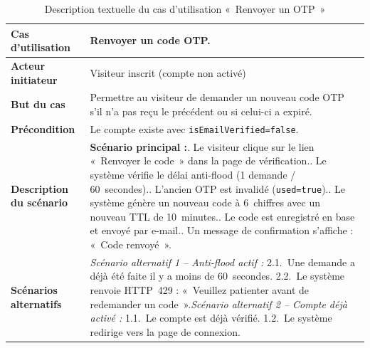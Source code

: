 \begin{table}[H]
  \caption{Description textuelle du cas d'utilisation «~Renvoyer un OTP~»}
  \label{tab:cu-renvoyer-otp}
  \centering
  \begin{tabularx}{\textwidth}{|L{3.8cm}|X|}
    \hline
    \textbf{Cas d'utilisation} & Renvoyer un code OTP. \\
    \hline
    \textbf{Acteur initiateur} & Visiteur inscrit (compte non activé) \\
    \hline
    \textbf{But du cas} & Permettre au visiteur de demander un nouveau code OTP s'il n'a pas reçu le précédent ou si celui-ci a expiré. \\
    \hline
    \textbf{Précondition} & Le compte existe avec \texttt{isEmailVerified=false}. \\
    \hline
    \textbf{Description du scénario} &
    \textbf{Scénario principal :}. Le visiteur clique sur le lien «~Renvoyer le code~» dans la page de vérification.. Le système vérifie le délai anti-flood (1 demande / 60~secondes).. L'ancien OTP est invalidé (\texttt{used=true}).. Le système génère un nouveau code à 6~chiffres avec un nouveau TTL de 10~minutes.. Le code est enregistré en base et envoyé par e-mail.. Un message de confirmation s'affiche : «~Code renvoyé~».\\
    \hline
    \textbf{Scénarios alternatifs} &
    \textit{Scénario alternatif 1 -- Anti-flood actif :}\newline
    \hspace*{6pt}2.1.~Une demande a déjà été faite il y a moins de 60~secondes.\newline
    \hspace*{6pt}2.2.~Le système renvoie HTTP~429 : «~Veuillez patienter avant de redemander un code~».\newline[2pt]
    \textit{Scénario alternatif 2 -- Compte déjà activé :}\newline
    \hspace*{6pt}1.1.~Le compte est déjà vérifié.\newline
    \hspace*{6pt}1.2.~Le système redirige vers la page de connexion.\\
    \hline
  \end{tabularx}
\end{table}

